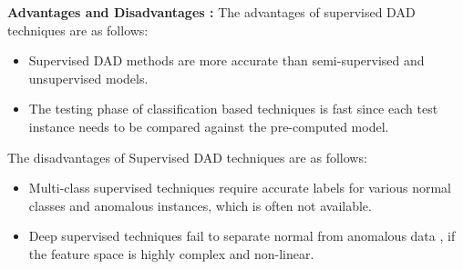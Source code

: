 \textbf{Advantages and Disadvantages :}
The advantages of supervised DAD techniques are as follows:
\begin{itemize}
\item Supervised DAD methods are more accurate than semi-supervised and unsupervised models.
\item The testing phase of classification based techniques is fast since each test instance
needs to be compared against the pre-computed model.
\end{itemize}
The disadvantages of Supervised DAD techniques are as follows:
\begin{itemize}
\item  Multi-class supervised techniques require accurate labels for various normal classes and anomalous instances, which is often not available.
\item Deep supervised techniques fail to separate normal from anomalous data , if the feature space is highly complex and non-linear.
\end{itemize}












